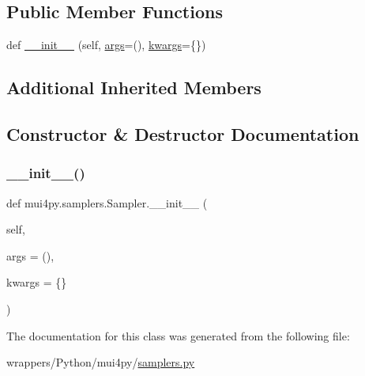 \subsection*{Public Member Functions}
\begin{DoxyCompactItemize}
\item 
def \hyperlink{classmui4py_1_1samplers_1_1_sampler_af5f15b46185b4142a002601e22e1a329}{\+\_\+\+\_\+init\+\_\+\+\_\+} (self, \hyperlink{classmui4py_1_1common_1_1_cpp_class_a29797823c6e21f22bba24ee7d35ef31d}{args}=(), \hyperlink{classmui4py_1_1common_1_1_cpp_class_af43879f06f07b1abf0d08e30c5ead46f}{kwargs}=\{\})
\end{DoxyCompactItemize}
\subsection*{Additional Inherited Members}


\subsection{Constructor \& Destructor Documentation}
\mbox{\label{classmui4py_1_1samplers_1_1_sampler_af5f15b46185b4142a002601e22e1a329}} 
\subsubsection{\texorpdfstring{\+\_\+\+\_\+init\+\_\+\+\_\+()}{\_\_init\_\_()}}
{\footnotesize\ttfamily def mui4py.\+samplers.\+Sampler.\+\_\+\+\_\+init\+\_\+\+\_\+ (\begin{DoxyParamCaption}\item[{}]{self,  }\item[{}]{args = {\ttfamily ()},  }\item[{}]{kwargs = {\ttfamily \{\}} }\end{DoxyParamCaption})}



The documentation for this class was generated from the following file\+:\begin{DoxyCompactItemize}
\item 
wrappers/\+Python/mui4py/\hyperlink{samplers_8py}{samplers.\+py}\end{DoxyCompactItemize}
